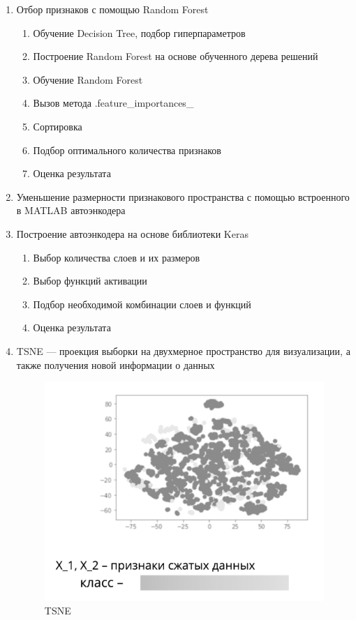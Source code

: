         \noindent
        \begin{enumerate}
            \item Отбор признаков с помощью Random Forest
            \begin{enumerate}
                \item Обучение Decision Tree, подбор гиперпараметров
                \item Построение Random Forest на основе обученного дерева решений
                \item Обучение Random Forest
                \item Вызов метода .feature\_importances\_
                \item Сортировка 
                \item Подбор оптимального количества признаков
                \item Оценка результата
            \end{enumerate}
            
            \item Уменьшение размерности признакового пространства с помощью встроенного в MATLAB автоэнкодера
            \item Построение автоэнкодера на основе библиотеки Keras
            \begin{enumerate}
                \item Выбор количества слоев и их размеров
                \item Выбор функций активации
                \item Подбор необходимой комбинации слоев и функций
                \item Оценка результата \\
            \end{enumerate}
            \item TSNE –– проекция выборки на двухмерное пространство для визуализации, а также получения новой информации о данных
            \begin{figure}[h!]
                \centering
                \includegraphics[scale=0.5]{pictures/tsne.png}
                \caption{TSNE
                }
                \label{fig:my_label}
            \end{figure} 
        \end{enumerate} 
        \newpage

